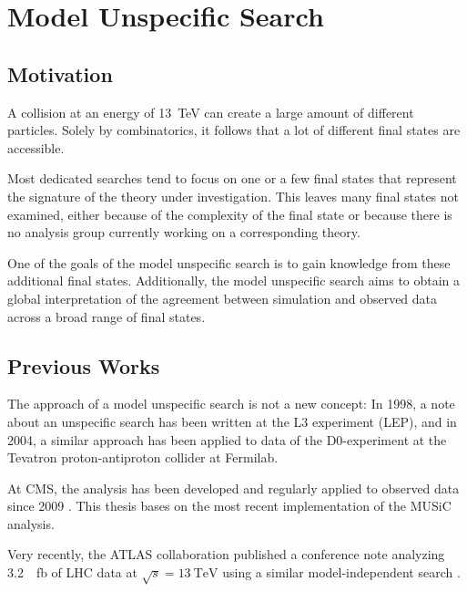 
\chapter{Model Unspecific Search}

\section{Motivation}
A collision at an energy of \SI{13}{\TeV} can create a large amount of different particles. Solely by combinatorics, it follows that a lot of different final states are accessible.

Most dedicated searches tend to focus on one or a few final states that represent the signature of the theory under investigation. This leaves many final states not examined, either because of the complexity of the final state or because there is no analysis group currently working on a corresponding theory.

One of the goals of the model unspecific search is to gain knowledge from these additional final states. Additionally, the model unspecific search aims to obtain a global interpretation of the agreement between simulation and observed data across a broad range of final states.

\section{Previous Works}
The approach of a model unspecific search is not a new concept: In 1998, a note about an unspecific search has been written at the L3 experiment (\ac{LEP})\cite{Hebbeker:GlobalComparisonL3}, and in 2004, a similar approach has been applied to data of the D0-experiment at the Tevatron proton-antiproton collider at Fermilab\cite{Biallass:ModelIndependentSearch}.

At \ac{CMS}, the analysis has been developed and regularly applied to observed data since 2009\cite{Schmitz:ModelUnspecificSearch,Hof:ImplementationModelIndependent,Dietz-Laursonn:ModelUnspecificSearch,Olschewski:StudyAlternativeStatistical,Brodski:ModelUnspecificSearch,Pieta:MUSiCModelUnspecific,Papacz:ModelUnspecificSearch,Albert:ExtensionModelUnspecific,Roemer:ModelUnspecificSearch} . 
This thesis bases on the most recent implementation of the \ac{MUSiC} analysis.

Very recently, the \ac{ATLAS} collaboration published a conference note analyzing \SI{3.2}{\per\femto\barn} of \ac{LHC} data at $\sqrt{s} = \SI{13}{\TeV}$ using a similar model-independent search \cite{ATLAS:ATLAS-CONF-2017-001}. 

